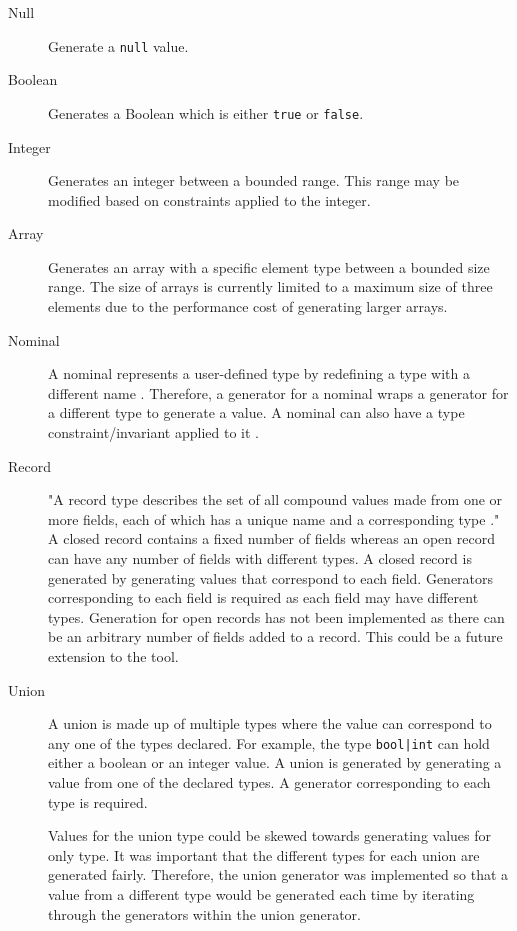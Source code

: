 \begin{description}
	\item[Null] Generate a \texttt{null} value.
	\item[Boolean] Generates a Boolean which is either \texttt{true} or \texttt{false}.
	\item[Integer] Generates an integer between a bounded range. This range may be modified based on constraints applied to the integer.
	\item[Array] Generates an array with a specific element type between a bounded size range.
	The size of arrays is currently limited to a maximum size of three elements due to the performance cost of generating larger arrays.
	\item[Nominal] A nominal represents a user-defined type by redefining a type with a different name \cite{WhileyLang}. Therefore, a generator for a nominal wraps a generator for a different type to generate a value. A nominal can also have a type constraint/invariant applied to it \cite{WhileyLang}.
	\item[Record] "A record type describes the set of all compound values made from one or more fields, each of which has a unique name and a corresponding type \cite{WhileyLang}." A closed record contains a fixed number of fields whereas an open record can have any number of fields with different types.
	A closed record is generated by generating values that correspond to each field. Generators corresponding to each field is required as each field may have different types. 
	Generation for open records has not been implemented as there can be an arbitrary number of fields added to a record. This could be a future extension to the tool.
	\item[Union] A union is made up of multiple types where the value can correspond to any one of the types declared. For example, the type \texttt{bool|int} can hold either a boolean or an integer value. 
	A union is generated by generating a value from one of the declared types. A generator corresponding to each type is required. 

	Values for the union type could be skewed towards generating values for only type. It was important that the different types for each union are generated fairly. Therefore, the union generator was implemented so that a value from a different type would be generated each time by iterating through the generators within the union generator.

\end{description}

